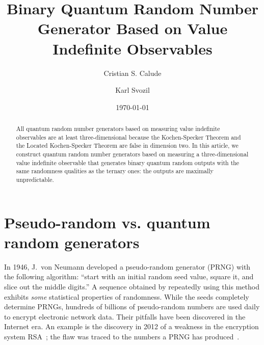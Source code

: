 \documentclass[%
 superscriptaddress,
  preprint,
 showpacs,
 showkeys,
 nofootinbib,
  amsmath,amssymb,
 pra,
  longbibliography,
  floatfix,
 ]{revtex4-2}
\theoremstyle{definition}
\begin{document}
\title{Binary Quantum Random Number Generator Based on Value Indefinite
Observables}

\author{Cristian S. Calude}




\author{Karl Svozil}



\date{\today}

\begin{abstract}
All quantum random number generators based on measuring value indefinite observables are at least three-dimensional because the Kochen-Specker Theorem and the Located Kochen-Specker Theorem are false in dimension two. In this article, we construct quantum random number generators based on measuring a three-dimensional value indefinite observable that generates binary quantum random outputs with the same randomness qualities as the ternary ones: the outputs are maximally unpredictable.
\end{abstract}


\maketitle

\newpage



\section{Pseudo-random vs. quantum random generators}

In 1946, J.~von Neumann developed a pseudo-random generator (PRNG) with the following algorithm:
``start with an initial random seed value, square it, and slice out the middle digits.''
A sequence obtained by repeatedly using this method exhibits {\it some} statistical properties of randomness.
While the seeds completely determine PRNGs, hundreds of billions of pseudo-random numbers are used daily to encrypt electronic network data.
Their pitfalls have been discovered in the Internet era.
An example is the discovery in 2012 of a weakness in the encryption system RSA~\cite{prng_flow};
the flaw was traced to the numbers a PRNG has produced~\cite{factor_wrong2012}.
\end{document}
